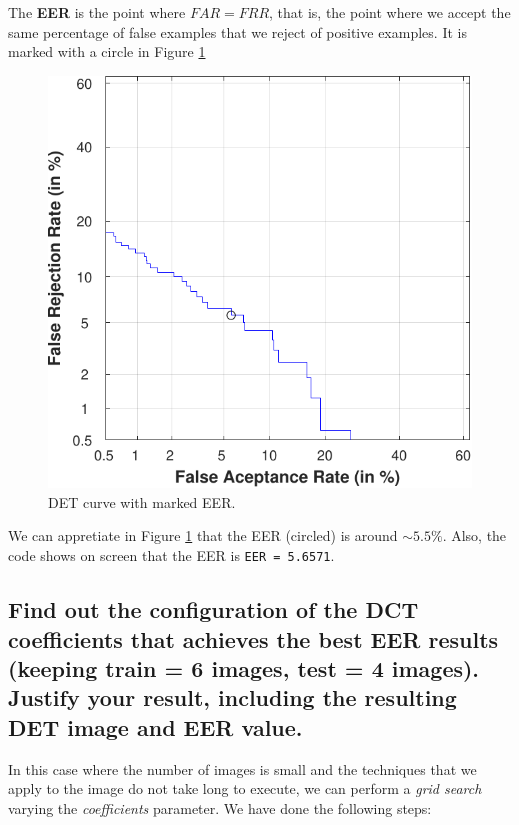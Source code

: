 \documentclass[a4paper]{article}
\def\inline{\lstinline[basicstyle=\ttfamily,keywordstyle={}]}
\begin{document}
The \textbf{EER} is the point where \(FAR = FRR\), that is, the point where we accept the same percentage of false examples that we reject of positive examples. It is marked with a circle in Figure \ref{fig:ex1b}


\begin{figure}[H]
  \centering
  \includegraphics[scale=0.7]{Figures/EER-1}
    \caption{DET curve with marked EER.}
    \label{fig:ex1b}
\end{figure}

We can appretiate in Figure \ref{fig:ex1b} that the EER (circled) is around \(\sim 5.5\%\). Also, the code shows on screen that the EER is \inline{EER = 5.6571}.


\subsection{Find out the configuration of the DCT coefficients that achieves the best EER results (keeping train = 6 images, test = 4 images). Justify your result, including the resulting DET image and EER value.}

In this case where the number of images is small and the techniques that we apply to the image do not take long to execute, we can perform a \emph{grid search} varying the \emph{coefficients} parameter. We have done the following steps:
\end{document}
